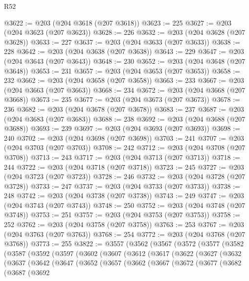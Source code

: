 \begin{lexlean}{R52}
\begin{coremodule}
@3622 := @203 (@204 @3618 (@207 @3618))
@3623 := 225
@3627 := @203 (@204 @3623 (@207 @3623))
@3628 := 226
@3632 := @203 (@204 @3628 (@207 @3628))
@3633 := 227
@3637 := @203 (@204 @3633 (@207 @3633))
@3638 := 228
@3642 := @203 (@204 @3638 (@207 @3638))
@3643 := 229
@3647 := @203 (@204 @3643 (@207 @3643))
@3648 := 230
@3652 := @203 (@204 @3648 (@207 @3648))
@3653 := 231
@3657 := @203 (@204 @3653 (@207 @3653))
@3658 := 232
@3662 := @203 (@204 @3658 (@207 @3658))
@3663 := 233
@3667 := @203 (@204 @3663 (@207 @3663))
@3668 := 234
@3672 := @203 (@204 @3668 (@207 @3668))
@3673 := 235
@3677 := @203 (@204 @3673 (@207 @3673))
@3678 := 236
@3682 := @203 (@204 @3678 (@207 @3678))
@3683 := 237
@3687 := @203 (@204 @3683 (@207 @3683))
@3688 := 238
@3692 := @203 (@204 @3688 (@207 @3688))
@3693 := 239
@3697 := @203 (@204 @3693 (@207 @3693))
@3698 := 240
@3702 := @203 (@204 @3698 (@207 @3698))
@3703 := 241
@3707 := @203 (@204 @3703 (@207 @3703))
@3708 := 242
@3712 := @203 (@204 @3708 (@207 @3708))
@3713 := 243
@3717 := @203 (@204 @3713 (@207 @3713))
@3718 := 244
@3722 := @203 (@204 @3718 (@207 @3718))
@3723 := 245
@3727 := @203 (@204 @3723 (@207 @3723))
@3728 := 246
@3732 := @203 (@204 @3728 (@207 @3728))
@3733 := 247
@3737 := @203 (@204 @3733 (@207 @3733))
@3738 := 248
@3742 := @203 (@204 @3738 (@207 @3738))
@3743 := 249
@3747 := @203 (@204 @3743 (@207 @3743))
@3748 := 250
@3752 := @203 (@204 @3748 (@207 @3748))
@3753 := 251
@3757 := @203 (@204 @3753 (@207 @3753))
@3758 := 252
@3762 := @203 (@204 @3758 (@207 @3758))
@3763 := 253
@3767 := @203 (@204 @3763 (@207 @3763))
@3768 := 254
@3772 := @203 (@204 @3768 (@207 @3768))
@3773 := 255
@3822 := @3557
    (@3562
      (@3567
        (@3572
          (@3577
            (@3582
              (@3587
                (@3592
                  (@3597
                    (@3602
                      (@3607
                        (@3612
                          (@3617
                            (@3622
                              (@3627
                                (@3632
                                  (@3637
                                    (@3642
                                      (@3647
                                        (@3652
                                          (@3657
                                            (@3662
                                              (@3667
                                                (@3672
                                                  (@3677
                                                    (@3682
                                                      (@3687
                                                        (@3692

\end{coremodule}
\end{lexlean}
